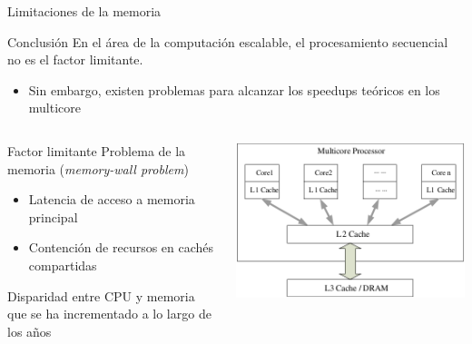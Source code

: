 \documentclass[utf8]{beamer}
\begin{document}
\begin{frame}{Limitaciones de la memoria}
    \begin{block}{Conclusión}
        En el área de la computación escalable, el procesamiento secuencial no es el factor limitante.
        \begin{itemize}
        \item Sin embargo, existen problemas para alcanzar los speedups teóricos en los multicore
        \end{itemize}
    \end{block}
    \begin{columns}
        \begin{column}{.6\linewidth}
            \begin{block}{Factor limitante}
                \small
                Problema de la memoria (\emph{memory-wall problem})
                \begin{itemize}
                    \item Latencia de acceso a memoria principal
                    \item Contención de recursos en cachés compartidas
                \end{itemize}
                Disparidad entre CPU y memoria que se ha incrementado a lo largo de los años
            \end{block}
        \end{column}
        \begin{column}{.3\linewidth}
            \begin{center}
            \includegraphics[width=.8\linewidth]{figures/multicore_mem}
            \end{center}
        \end{column}
    \end{columns} 
\end{frame}
\end{document}
